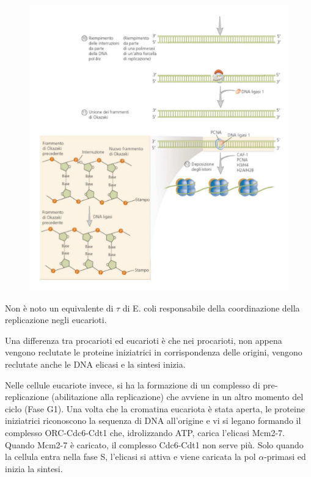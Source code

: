 \documentclass[11pt]{book}
\begin{document}
\begin{figure}[htp]
\centering
\includegraphics[scale=0.5]{img/19_ligasi.png}
\caption{}
\label{ligasi}
\end{figure}

Non è noto un equivalente di \(\tau\) di E. coli responsabile della
coordinazione della replicazione negli eucarioti.

Una differenza tra procarioti ed eucarioti è che nei procarioti, non
appena vengono reclutate le proteine iniziatrici in corrispondenza delle
origini, vengono reclutate anche le DNA elicasi e la sintesi inizia.

Nelle cellule eucariote invece, si ha la formazione di un complesso di
pre-replicazione (abilitazione alla replicazione) che avviene in un
altro momento del ciclo (Fase G1). Una volta che la cromatina eucariota
è stata aperta, le proteine iniziatrici riconoscono la sequenza di DNA
all'origine e vi si legano formando il complesso ORC-Cdc6-Cdt1 che,
idrolizzando ATP, carica l'elicasi Mcm2-7. Quando Mcm2-7 è caricato, il
complesso Cdc6-Cdt1 non serve più. Solo quando la cellula entra nella
fase S, l'elicasi si attiva e viene caricata la pol \(\alpha\)-primasi
ed inizia la sintesi.
\end{document}

